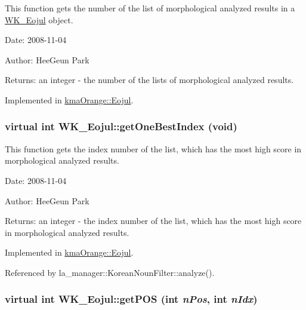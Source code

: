 This function gets the number of the list of morphological analyzed results in a \hyperlink{classWK__Eojul}{WK\_\-Eojul} object. 

\begin{Desc}
\item[Date:]2008-11-04 \end{Desc}
\begin{Desc}
\item[Author:]HeeGeun Park \end{Desc}
\begin{Desc}
\item[Returns:]an integer - the number of the lists of morphological analyzed results. \end{Desc}


Implemented in \hyperlink{classkmaOrange_1_1Eojul_74dedea3f0a141fe7f03af3a8aaa29ac}{kmaOrange::Eojul}.\hypertarget{classWK__Eojul_0588cf004a9d2f10cebd1d729c328abd}{
\subsubsection[{getOneBestIndex}]{\setlength{\rightskip}{0pt plus 5cm}virtual int WK\_\-Eojul::getOneBestIndex (void)}}
\label{classWK__Eojul_0588cf004a9d2f10cebd1d729c328abd}


This function gets the index number of the list, which has the most high score in morphological analyzed results. 

\begin{Desc}
\item[Date:]2008-11-04 \end{Desc}
\begin{Desc}
\item[Author:]HeeGeun Park \end{Desc}
\begin{Desc}
\item[Returns:]an integer - the index number of the list, which has the most high score in morphological analyzed results. \end{Desc}


Implemented in \hyperlink{classkmaOrange_1_1Eojul_4fe920a2411e20769cc049e2c3ea8571}{kmaOrange::Eojul}.

Referenced by la\_\-manager::KoreanNounFilter::analyze().\hypertarget{classWK__Eojul_e558aad6c32e899ea725882f3bdc0896}{
\subsubsection[{getPOS}]{\setlength{\rightskip}{0pt plus 5cm}virtual int WK\_\-Eojul::getPOS (int {\em nPos}, \/  int {\em nIdx})}}
\label{classWK__Eojul_e558aad6c32e899ea725882f3bdc0896}


